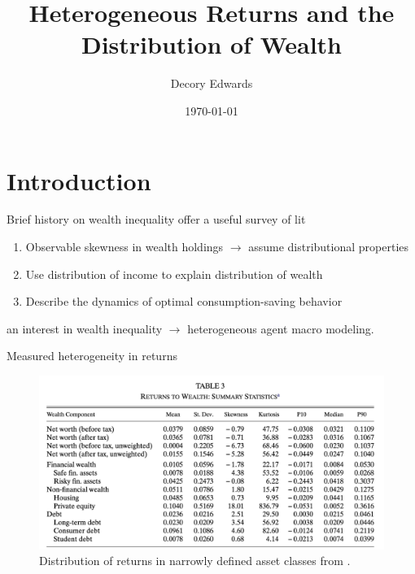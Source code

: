 \documentclass{beamer}
\title[]{Heterogeneous Returns and the Distribution of Wealth}
\author[Edwards]{Decory Edwards}
\institute[JHU]{Johns Hopkins University}
\date{\today}
\begin{document}
\begin{frame}
  \titlepage
\end{frame}

\section{Introduction}

\begin{frame}{Brief history on wealth inequality}
  \cite{jbab18} offer a useful survey of lit

  \vspace{2.5mm}
\begin{enumerate}
\item Observable skewness in wealth holdings $\rightarrow$ assume distributional properties
\item Use distribution of income to explain distribution of wealth
\item Describe the dynamics of optimal consumption-saving behavior
\end{enumerate}

\vspace{2.5mm}
an interest in wealth inequality $\rightarrow$ heterogeneous agent macro modeling.

\end{frame}


\begin{frame}{Measured heterogeneity in returns}

 \begin{figure}
    \includegraphics[height=.6\textheight]{Figures/Fagereng2020Tab3.png}
    \captionsetup{font=scriptsize}
    \caption{Distribution of returns in narrowly defined asset classes from \cite{aflgdmlp20}.}
  \end{figure}



\end{frame}
\end{document}
